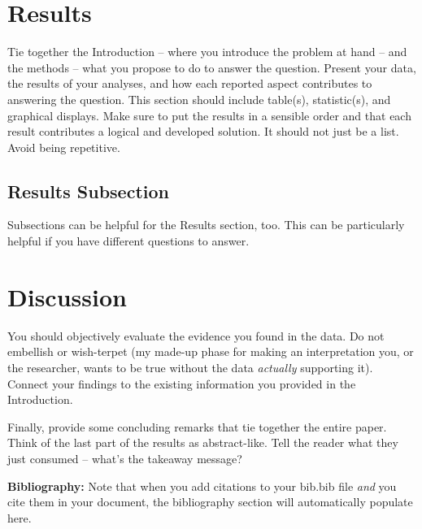 \documentclass{article}\usepackage[]{graphicx}\usepackage[]{xcolor}
\begin{document}
\begin{multicols}{2}
\section{Results}
Tie together the Introduction -- where you introduce the problem at hand -- and the methods --  what you propose to do to answer the question. Present your data, the results of your analyses, and how each reported aspect contributes to answering the question. This section should include table(s), statistic(s), and graphical displays. Make sure to put the results in a sensible order and that each result contributes a logical and developed solution. It should not just be a list. Avoid being repetitive. 

\subsection{Results Subsection}
Subsections can be helpful for the Results section, too. This can be particularly helpful if you have different questions to answer. 


\section{Discussion}
 You should objectively evaluate the evidence you found in the data. Do not embellish or wish-terpet (my made-up phase for making an interpretation you, or the researcher, wants to be true without the data \emph{actually} supporting it). Connect your findings to the existing information you provided in the Introduction.

Finally, provide some concluding remarks that tie together the entire paper. Think of the last part of the results as abstract-like. Tell the reader what they just consumed -- what's the takeaway message?

\vspace{2em}

\noindent\textbf{Bibliography:} Note that when you add citations to your bib.bib file \emph{and}
you cite them in your document, the bibliography section will automatically populate here.

\begin{tiny}

\end{tiny}
\end{multicols}
\end{document}
